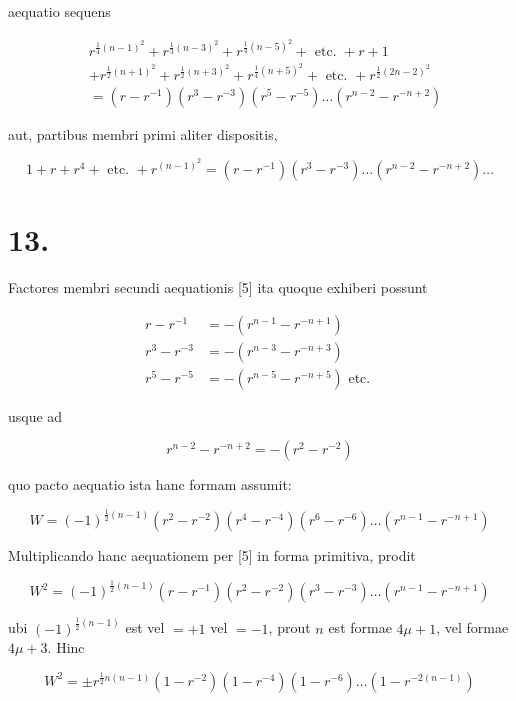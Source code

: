 \documentclass[10pt]{article}
\begin{document}
aequatio sequens

\[
\begin{aligned}
& r^{\frac{1}{4}(n-1)^{2}}+r^{\frac{1}{3}(n-3)^{2}}+r^{\frac{1}{4}(n-5)^{2}}+\text { etc. }+r+1 \\
&+r^{\frac{1}{2}(n+1)^{2}}+r^{\frac{1}{2}(n+3)^{2}}+r^{\frac{1}{4}(n+5)^{2}}+\text { etc. }+r^{\frac{1}{2}(2 n-2)^{2}} \\
&=\left(r-r^{-1}\right)\left(r^{3}-r^{-3}\right)\left(r^{5}-r^{-5}\right) \ldots\left(r^{n-2}-r^{-n+2}\right)
\end{aligned}
\]

aut, partibus membri primi aliter dispositis,

\[
1+r+r^{4}+\text { etc. }+r^{(n-1)^{2}}=\left(r-r^{-1}\right)\left(r^{3}-r^{-3}\right) \ldots\left(r^{n-2}-r^{-n+2}\right) \ldots
\]

\section*{13.}
Factores membri secundi aequationis [5] ita quoque exhiberi possunt

\[
\begin{aligned}
r-r^{-1} & =-\left(r^{n-1}-r^{-n+1}\right) \\
r^{3}-r^{-3} & =-\left(r^{n-3}-r^{-n+3}\right) \\
r^{5}-r^{-5} & =-\left(r^{n-5}-r^{-n+5}\right) \text { etc. }
\end{aligned}
\]

usque ad

\[
r^{n-2}-r^{-n+2}=-\left(r^{2}-r^{-2}\right)
\]

quo pacto aequatio ista hanc formam assumit:

\[
W=(-1)^{\frac{1}{2}(n-1)}\left(r^{2}-r^{-2}\right)\left(r^{4}-r^{-4}\right)\left(r^{6}-r^{-6}\right) \ldots\left(r^{n-1}-r^{-n+1}\right)
\]

Multiplicando hanc aequationem per [5] in forma primitiva, prodit

\[
W^{2}=(-1)^{\frac{1}{2}(n-1)}\left(r-r^{-1}\right)\left(r^{2}-r^{-2}\right)\left(r^{3}-r^{-3}\right) \ldots\left(r^{n-1}-r^{-n+1}\right)
\]

ubi \((-1)^{\frac{1}{2}(n-1)}\) est vel \(=+1\) vel \(=-1\), prout \(n\) est formae \(4 \mu+1\), vel formae \(4 \mu+3\). Hinc

\[
W^{2}= \pm r^{\frac{1}{2} n(n-1)}\left(1-r^{-2}\right)\left(1-r^{-4}\right)\left(1-r^{-6}\right) \ldots\left(1-r^{-2(n-1)}\right)
\]
\end{document}
